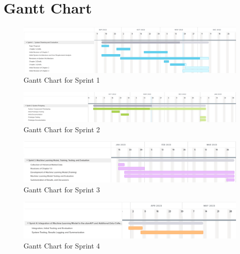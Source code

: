 \section{Gantt Chart}
\label{sec:gantt_chart}

\clearpage
\begin{figure}[ht]
    \centering
    \includegraphics[width=1\textwidth]{./assets/Gantt_Chart_Sprint1.png}
    \caption{Gantt Chart for Sprint 1}
    \label{fig:gantt_chart_sprint1}
\end{figure}

\begin{figure}[ht]
    \centering
    \includegraphics[width=1\textwidth]{./assets/Gantt_Chart_Sprint2.png}
    \caption{Gantt Chart for Sprint 2}
    \label{fig:gantt_chart_sprint2}
\end{figure}

\begin{figure}[ht]
    \centering
    \includegraphics[width=1\textwidth]{./assets/Gantt_Chart_Sprint3.png}
    \caption{Gantt Chart for Sprint 3}
    \label{fig:gantt_chart_sprint3}
\end{figure}

\begin{figure}[ht]
    \centering
    \includegraphics[width=1\textwidth]{./assets/Gantt_Chart_Sprint4.png}
    \caption{Gantt Chart for Sprint 4}
    \label{fig:gantt_chart_sprint4}
\end{figure}

